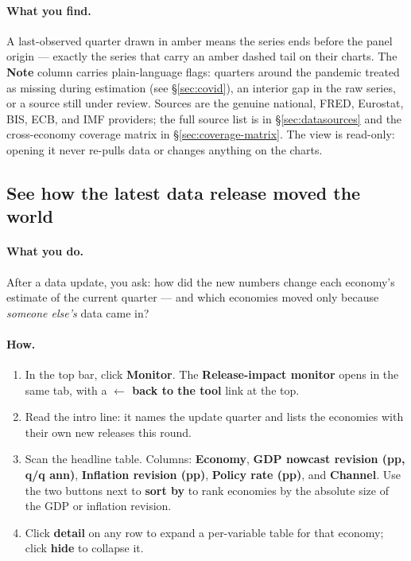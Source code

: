 \documentclass[11pt]{article}
\theoremstyle{definition}
\theoremstyle{remark}
\begin{document}
\paragraph{What you find.}
A last-observed quarter drawn in amber means the series ends before the panel
origin --- exactly the series that carry an amber dashed tail on their charts. The
\textbf{Note} column carries plain-language flags: quarters around the pandemic
treated as missing during estimation (see \S\ref{sec:covid}), an interior gap in
the raw series, or a source still under review. Sources are the genuine national,
FRED, Eurostat, BIS, ECB, and IMF providers; the full source list is in
\S\ref{sec:datasources} and the cross-economy coverage matrix in
\S\ref{sec:coverage-matrix}. The view is read-only: opening it never re-pulls data
or changes anything on the charts.

\subsection{See how the latest data release moved the world}

\paragraph{What you do.}
After a data update, you ask: how did the new numbers change each economy's
estimate of the current quarter --- and which economies moved only because
\emph{someone else's} data came in?

\paragraph{How.}
\begin{enumerate}
  \item In the top bar, click \textbf{Monitor}. The \textbf{Release-impact
    monitor} opens in the same tab, with a \textbf{$\leftarrow$ back to the tool}
    link at the top.
  \item Read the intro line: it names the update quarter and lists the economies
    with their own new releases this round.
  \item Scan the headline table. Columns: \textbf{Economy}, \textbf{GDP nowcast
    revision (pp, q/q ann)}, \textbf{Inflation revision (pp)}, \textbf{Policy rate
    (pp)}, and \textbf{Channel}. Use the two buttons next to \textbf{sort by} to
    rank economies by the absolute size of the GDP or inflation revision.
  \item Click \textbf{detail} on any row to expand a per-variable table for that
    economy; click \textbf{hide} to collapse it.
\end{enumerate}
\end{document}

